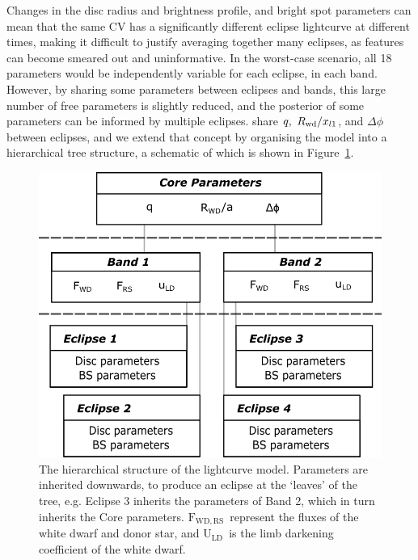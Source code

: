 Changes in the disc radius and brightness profile, and bright spot parameters can mean that the same CV has a significantly different eclipse lightcurve at different times, making it difficult to justify averaging together many eclipses, as features can become smeared out and uninformative. In the worst-case scenario, all 18 parameters would be independently variable for each eclipse, in each band. However, by sharing some parameters between eclipses and bands, this large number of free parameters is slightly reduced, and the posterior of some parameters can be informed by multiple eclipses. \citet{McAllister2017} share $q,\ R_{\rm wd} / x_{l1}$, and $\Delta\phi$ between eclipses, and we extend that concept by organising the model into a hierarchical tree structure, a schematic of which is shown in Figure~\ref{fig:method:hierarchical_model}.

\begin{figure}
    \centering
    \includegraphics[width=.85\columnwidth ]{figures/three_cvs_with_weird_colours/GeneralFigs/hierarchical_model_structure.png}
    \caption{The hierarchical structure of the lightcurve model. Parameters are inherited downwards, to produce an eclipse at the `leaves' of the tree, e.g. Eclipse 3 inherits the parameters of Band 2, which in turn inherits the Core parameters. $\mathrm{F_{WD, RS}}$\ represent the fluxes of the white dwarf and donor star, and $\mathrm{U_{LD}}$\ is the limb darkening coefficient of the white dwarf.}
    \label{fig:method:hierarchical_model}
\end{figure}

